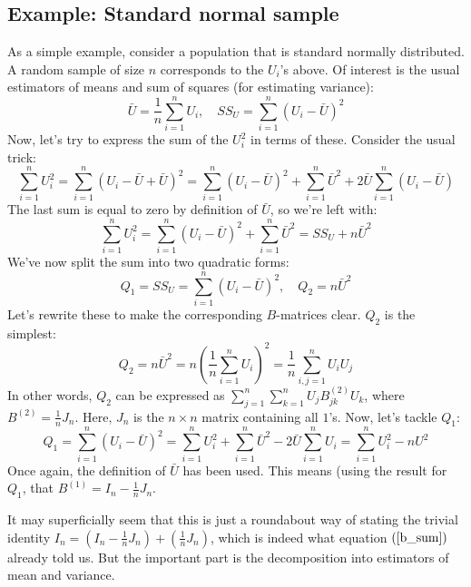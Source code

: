 \documentclass[12pt, a4paper]{article}
\begin{document}
\subsection{Example: Standard normal sample}
As a simple example, consider a population that is standard normally distributed. A random sample of size $n$ corresponds to the $U_i$'s above. Of interest is the usual estimators of means and sum of squares (for estimating variance):
\begin{equation}
\bar{U}=\frac{1}{n}\sum_{i=1}^n U_i,\quad SS_U=\sum_{i=1}^n(U_i-\bar{U})^2
\end{equation}
Now, let's try to express the sum of the $U_i^2$ in terms of these. Consider the usual trick:
\begin{equation}
\sum_{i=1}^n U_i^2 = \sum_{i=1}^n(U_i-\bar{U}+\bar{U})^2=\sum_{i=1}^n(U_i-\bar{U})^2+\sum_{i=1}^n\bar{U}^2+2\bar{U}\sum_{i=1}^n(U_i-\bar{U})
\end{equation}
The last sum is equal to zero by definition of $\bar{U}$, so we're left with:
\begin{equation}
\sum_{i=1}^n U_i^2 = \sum_{i=1}^n(U_i-\bar{U})^2+\sum_{i=1}^n\bar{U}^2 = SS_U + n\bar{U}^2
\end{equation}
We've now split the sum into two quadratic forms:
\begin{equation}
Q_1=SS_U=\sum_{i=1}^n(U_i-\bar{U})^2,\quad Q_2=n\bar{U}^2
\end{equation}
Let's rewrite these to make the corresponding $B$-matrices clear. $Q_2$ is the simplest:
\begin{equation}
Q_2=n\bar{U}^2=n\left(\frac{1}{n}\sum_{i=1}^n U_i\right)^2=\frac{1}{n}\sum_{i,j=1}^n U_i U_j
\end{equation}
In other words, $Q_2$ can be expressed as $\sum_{j=1}^n\sum_{k=1}^n U_j B^{(2)}_{jk}U_k$, where $B^{(2)}=\frac{1}{n}J_n$. Here, $J_n$ is the $n\times n$ matrix containing all $1$'s. Now, let's tackle $Q_1$:
\begin{equation}
Q_1=\sum_{i=1}^n(U_i-\bar{U})^2=\sum_{i=1}^n U_i^2 + \sum_{i=1}^n\bar{U}^2 - 2\bar{U}\sum_{i=1}^n U_i = \sum_{i=1}^n U_i^2 - n{U}^2  
\end{equation}
Once again, the definition of $\bar{U}$ has been used. This means (using the result for $Q_1$, that $B^{(1)}=I_n-\frac{1}{n}J_n$.\par
It may superficially seem that this is just a roundabout way of stating the trivial identity $I_n = \left(I_n-\frac{1}{n}J_n\right) + \left(\frac{1}{n}J_n\right)$, which is indeed what equation $(\ref{b_sum})$ already told us. But the important part is the decomposition into estimators of mean and variance.
\end{document}

